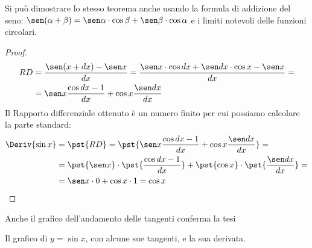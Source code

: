 
\begin{osservazione}
Si può dimostrare lo stesso teorema anche usando la formula di addizione 
del seno:
\(\sen(\alpha+\beta) = 
\sen \alpha \cdot \cos \beta + \sen \beta \cdot \cos \alpha\) e 
i limiti notevoli delle funzioni circolari.
\begin{proof}
\begin{align*}
RD &= \dfrac{\sen(x+dx)-\sen x}{dx} =
      \dfrac{\sen x \cdot \cos dx + \sen dx \cdot \cos x - \sen x}{dx} = \\
   &= \sen x \dfrac{\cos dx-1}{dx}+ \cos x\dfrac{\sen dx}{dx}
\end{align*}
Il Rapporto differenziale ottenuto è un numero finito per cui possiamo 
calcolare la parte standard:
\begin{align*}
\Deriv{\sin x} &= \pst{RD} = 
    \pst{\sen x \dfrac{\cos dx-1}{dx} + \cos x\dfrac{\sen dx}{dx}} = \\
&=  \pst{\sen x} \cdot \pst{\dfrac{\cos dx-1}{dx}} + 
    \pst{\cos x} \cdot \pst{\dfrac{\sen dx}{dx}} = \\
&=  \sen x\cdot 0 + \cos x\cdot 1 = \cos x
\end{align*}
\end{proof}
\end{osservazione}

\begin{osservazione}
Anche il grafico dell'andamento delle tangenti conferma la tesi\\
\begin{inaccessibleblock}
\end{inaccessibleblock}
\label{}
\begin{center} Il grafico di \(y = \sin x\), con alcune sue tangenti, e 
la sua derivata.\end{center}
\end{osservazione}


